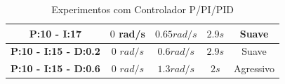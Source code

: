 \begin{table}[!htb]
\begin{tabular}{|c|c|c|c|c|}
		\textbf{P:10 - I:17}                                                                      & $0$ rad/s                                                               & $0.65 rad/s$                                                            & $2.9s$                                                                    & Suave             \\ \hline
		\textbf{P:10 - I:15 - D:0.2}                                                              & $0$ $rad/s$                                                               & $0.6 rad/s$                                                            & $2.9s$                                                                    & Suave             \\ \hline
		\textbf{P:10 - I:15 - D:0.6}                                                              & $0$ $rad/s$                                                               & $1.3 rad/s$                                                           & $2s$                                                                      & Agressivo         \\ \hline
	\end{tabular}
	\caption{Experimentos com Controlador P/PI/PID}
	\label{t:cpid}
\end{table}


